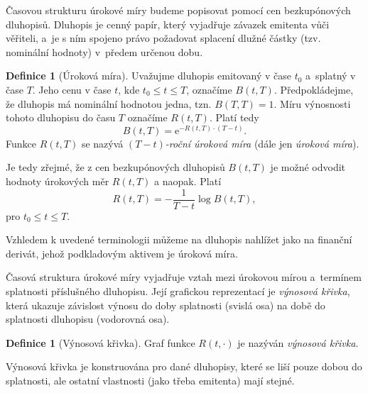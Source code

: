 \documentclass[a4paper,12pt]{report}
\theoremstyle{definition} \newtheorem{definice}[veta]{Definice}
\theoremstyle{remark}
\begin{document}
Časovou strukturu úrokové míry budeme popisovat pomocí cen bezkupónových dluhopisů.
Dluhopis je cenný papír, který vyjadřuje závazek emitenta vůči věřiteli, a~je s ním spojeno právo požadovat splacení dlužné částky (tzv. nominální hodnoty) v~předem určenou dobu.

\begin{definice}[Úroková míra]
Uvažujme dluhopis emitovaný v čase $t_0$ a~splat\-ný v čase $T$.
Jeho cenu v čase $t$, kde $t_0\leq t\leq T$, označíme $B(t,T)$.
Předpokládejme, že dluhopis má nominální hodnotou jedna, tzn. $B(T,T)=1$.
Míru výnosnosti tohoto dluhopisu do času $T$ označíme $R(t,T)$.
Platí tedy
\begin{equation}
B(t,T)=\mathrm{e}^{-R(t,T)\cdot(T-t)}.
\end{equation} 
Funkce $R(t,T)$ se nazývá \textit{$(T-t)$-roční úroková míra} (dále jen \textit{úroková míra}).
\end{definice}
Je tedy zřejmé, že z cen bezkupónových dluhopisů $B(t,T)$ je možné odvodit hodnoty úrokových měr $R(t,T)$ a naopak.
Platí
\begin{equation}\label{urokova_mira_z_dluhopisu_vztah}
R(t,T)=-\frac{1}{T-t}\log B(t,T),
\end{equation} 
pro $t_0\leq t\leq T$.

Vzhledem k uvedené terminologii můžeme na dluhopis nahlížet jako na finanční derivát, jehož podkladovým aktivem je úroková míra.

Časová struktura úrokové míry vyjadřuje vztah mezi úrokovou mírou a~termínem splatnosti příslušného dluhopisu.
Její grafickou reprezentací je \textit{výnosová křivka}, která ukazuje závislost výnosu do doby splatnosti (svislá osa) na době do splatnosti dluhopisu (vodorovná osa). 
\begin{definice}[Výnosová křivka]
Graf funkce $R(t,\cdot)$ je nazýván \textit{výnosová křivka}.
\end{definice}
Výnosová křivka je konstruována pro dané dluhopisy, které se liší pouze dobou do splatnosti, ale ostatní vlastnosti (jako třeba emitenta) mají stejné.
\end{document}
